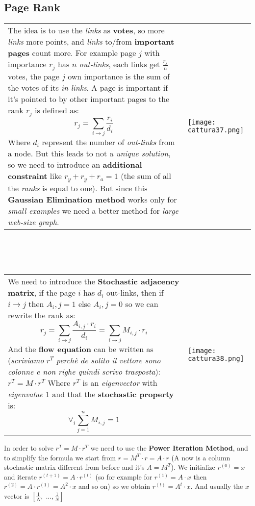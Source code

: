 \documentclass{article}
\begin{document}
\subsection{Page Rank}
\begin{tabular}{L{10cm} C{5cm}}
The idea is to use the \emph{links} as \textbf{votes}, so more \emph{links} more points, and \emph{links} to/from \textbf{important pages} count more. For example page $j$ with importance $r_j$ has $n$ \emph{out-links}, each links get $\frac{r_j}{n}$ votes, the page $j$ own importance is the sum of the votes of its \emph{in-links}. A page is important if it's pointed to by other important pages to the rank $r_j$ is defined as:
\[r_j = \sum_{i\rightarrow j} \frac{r_i}{d_i}\]
Where $d_i$ represent the number of \emph{out-links} from a node. But this leads to not a \emph{unique solution}, so we need to introduce an \textbf{additional constraint} like $r_y + r_y + r_a = 1$ (the sum of all the \emph{ranks} is equal to one). But since this \textbf{Gaussian Elimination method} works only for \emph{small examples} we need a better method for \emph{large web-size graph}.
& \texttt{[image: cattura37.png]}
\end{tabular}\\\\\\
\begin{tabular}{L{10cm} C{5cm}}
We need to introduce the \textbf{Stochastic adjacency matrix}, if the page $i$ has $d_i$ out-links, then if $i \rightarrow j$ then $A_i,j =1$ else $A_i,j = 0$ so we can rewrite the rank as:
\[r_j = \sum_{i\rightarrow j} \frac{A_{i,j} \cdot r_i}{d_i} =  \sum_{i\rightarrow j} M_{i,j} \cdot r_i\]
And the \textbf{flow equation} can be written as (\emph{scriviamo} $r^T$ \emph{perchè de solito il vettore sono colonne e non righe quindi scrivo trasposta}): $r^T = M \cdot r^T$
Where $r^T$ is an \emph{eigenvector} with \emph{eigenvalue} 1 and that the \textbf{stochastic property} is: 
\[\forall_i \sum_{j = 1}^{n} M_{i,j} = 1\]
& \texttt{[image: cattura38.png]}
\end{tabular}
In order to solve $r^T = M \cdot r^T$ we need to use the \textbf{Power Iteration Method}, and to simplify the formula we start from $r = M^T \cdot r = A \cdot r$ (A now is a column stochastic matrix different from before and it's $A = M^T$). We initialize $r^{(0)} = x$ and iterate $r^{(t+1)} = A \cdot r^{(t)}$ (so for example for $r^{(1)} = A \cdot x$ then $r^{(2)} = A \cdot r^{(1)} = A^2 \cdot x$ and so on) so we obtain $r^{(t)} = A^t \cdot x$. And usually the $x$ vector is $\left [\frac{1}{N},\; ..., \frac{1}{N}\right ]$\\\\
\end{document}
